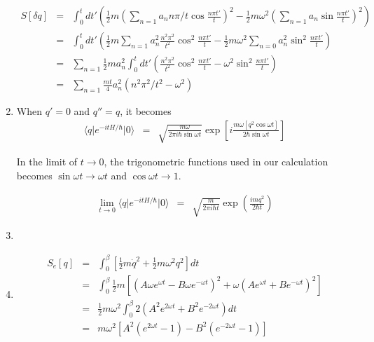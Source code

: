 \documentclass[12pt,a4paper]{article}
\begin{document}
\begin{enumerate}
\begin{eqnarray*}
	S[\delta q] &=& \int_0^t d t' \left( \frac12 m \left( \sum_{n=1} a_n n\pi/t\cos\frac{n\pi t'}{t} \right)^2 -\frac12 m\omega^2\left( \sum_{n=1} a_n \sin\frac{n\pi t'}{t} \right)^2 \right) \\
	&=& \int_0^t  d t'\left( \frac12 m \sum_{n=1} a_n^2 \frac{n^2\pi^2}{t^2} \cos^2\frac{n\pi t'}{t} - \frac12 m\omega^2 \sum_{n=0} a_n^2 \sin^2\frac{n\pi t'}{t}  \right) \\
	&=& \sum_{n=1} \frac12 m a_n^2 \int_0^t  d t' \left( \frac{n^2 \pi^2}{t^2}\cos^2\frac{n\pi t'}{t} - \omega^2 \sin^2\frac{n\pi t'}{t}\right) \\
	&=& \sum_{n=1} \frac{mt}{4} a_n^2 \left( n^2 \pi^2/t^2 - \omega^2 \right)
\end{eqnarray*}






\item


When $q'=0$ and $q''=q$, it becomes
\begin{eqnarray*}
	\langle q \vert e^{-i t H/\hbar } \vert 0 \rangle &=& \sqrt{\frac{m\omega}{2\pi i \hbar \sin\omega t}} \exp\left[ i\frac{m\omega[ q^2 \cos\omega t ]}{2\hbar \sin\omega t} \right]
\end{eqnarray*}

In the limit of $t\rightarrow 0$, the trigonometric functions used in our calculation becomes $\sin\omega t \rightarrow \omega t$ and $\cos\omega t \rightarrow 1$.

\begin{eqnarray*}
	\lim_{t\rightarrow 0}\langle q \vert e^{-i t H/\hbar } \vert 0 \rangle &=& \sqrt{\frac{m}{2\pi i \hbar t}} \exp\left( \frac{imq^2}{2\hbar t} \right)
\end{eqnarray*}





\item




\item

\begin{eqnarray*}
	S_e[q] &=& \int_0^{\beta} \left[ \frac12 m \dot q^2 +\frac12 m\omega^2 q^2 \right] d t \\
	&=& \int_0^{\beta} \frac12 m \left[ (A\omega e^{\omega t} - B \omega e^{-\omega t})^2 + \omega ( A e^{\omega t} + B e^{-\omega t})^2 \right] \\
	&=& \frac{1}{2} m\omega^2 \int_0^\beta 2( A^2 e^{2\omega t} + B^2 e^{-2 \omega t}  ) d t \\
	&=& m\omega^2 \left[ A^2 (e^{2\omega t} - 1) - B^2(e^{-2\omega t} - 1) \right]
\end{eqnarray*}




\end{enumerate}
\end{document}
